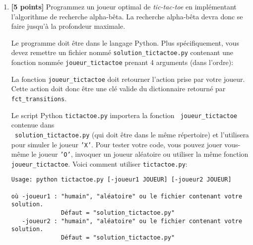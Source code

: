 \documentclass{article}
\newenvironment{itemize*}%
  {\vspace*{.1cm}\begin{itemize}%
      \setlength{\itemsep}{0pt}%
      \setlength{\parskip}{0pt}}%
  {\end{itemize}\vspace*{.1cm}}
\begin{document}
\begin{enumerate}[itemsep=20pt]
\newpage

\item {\bf [5 points]} Programmez un joueur optimal de {\it
    tic-tac-toe} en implémentant l'algorithme de recherche
  alpha-bêta. La recherche alpha-bêta devra donc se faire jusqu'à la
  profondeur maximale.

  Le programme doit être dans le langage Python. Plus spécifiquement,
  vous devez remettre un fichier nommé {\tt solution\_tictactoe.py} contenant une
  fonction nommée {\tt joueur\_tictactoe} prenant 4
  arguments (dans l'ordre):
  La fonction {\tt joueur\_tictactoe} doit retourner l'action
  prise par votre joueur. Cette action doit donc être une clé valide du dictionnaire
  retourné par {\tt fct\_transitions}.

  Le script Python {\tt tictactoe.py} importera la fonction {\tt
    joueur\_tictactoe} contenue dans \\{\tt
    solution\_tictactoe.py} (qui doit être dans le même répertoire) et
  l'utilisera pour simuler le joueur {\tt 'X'}. Pour tester votre
  code, vous pouvez jouer vous-même le joueur {\tt 'O'}, invoquer un joueur
  aléatoire ou utiliser la même fonction {\tt
    joueur\_tictactoe}. Voici comment utiliser
  {\tt tictactoe.py}:
\begin{verbatim}
Usage: python tictactoe.py [-joueur1 JOUEUR] [-joueur2 JOUEUR]

où -joueur1 : "humain", "aléatoire" ou le fichier contenant votre solution.
              Défaut = "solution_tictactoe.py"
   -joueur2 : "humain", "aléatoire" ou le fichier contenant votre solution.
              Défaut = "solution_tictactoe.py"
\end{verbatim}


\end{enumerate}
\end{document}
